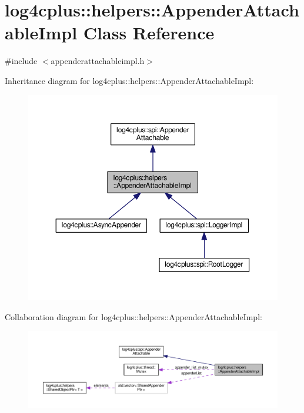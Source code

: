 \hypertarget{classlog4cplus_1_1helpers_1_1AppenderAttachableImpl}{\section{log4cplus\-:\-:helpers\-:\-:Appender\-Attachable\-Impl Class Reference}
\label{classlog4cplus_1_1helpers_1_1AppenderAttachableImpl}
}


{\ttfamily \#include $<$appenderattachableimpl.\-h$>$}



Inheritance diagram for log4cplus\-:\-:helpers\-:\-:Appender\-Attachable\-Impl\-:
\nopagebreak
\begin{figure}[H]
\begin{center}
\leavevmode
\includegraphics[width=350pt]{classlog4cplus_1_1helpers_1_1AppenderAttachableImpl__inherit__graph}
\end{center}
\end{figure}


Collaboration diagram for log4cplus\-:\-:helpers\-:\-:Appender\-Attachable\-Impl\-:
\nopagebreak
\begin{figure}[H]
\begin{center}
\leavevmode
\includegraphics[width=350pt]{classlog4cplus_1_1helpers_1_1AppenderAttachableImpl__coll__graph}
\end{center}
\end{figure}
